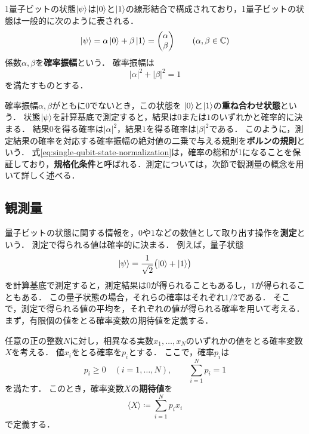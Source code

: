 1量子ビットの状態$\ket{\psi}$は$\ket{0}$と$\ket{1}$の線形結合で構成されており，1量子ビットの状態は一般的に次のように表される．
\begin{equation*}
  \ket{\psi}=\alpha\ket{0}+\beta\ket{1} = \begin{pmatrix}\alpha\\\beta\end{pmatrix}
  \qquad
  (\alpha,\beta\in\mathbb C)
\end{equation*}
係数$\alpha,\beta$を\textbf{確率振幅}という．
確率振幅は
\begin{equation}
  |\alpha|^2+|\beta|^2=1
  \label{eq:single-qubit-state-normalization}
\end{equation}
を満たすものとする．

確率振幅$\alpha,\beta$がともに$0$でないとき，この状態を
$\ket{0}$と$\ket{1}$の\textbf{重ね合わせ状態}という．
状態$\ket{\psi}$を計算基底で測定すると，結果は$0$または$1$のいずれかと確率的に決まる．
結果$0$を得る確率は$|\alpha|^2$，結果$1$を得る確率は$|\beta|^2$である．
このように，測定結果の確率を対応する確率振幅の絶対値の二乗で与える規則を\textbf{ボルンの規則}という．
式\eqref{eq:single-qubit-state-normalization}は，確率の総和が1になることを保証しており，\textbf{規格化条件}と呼ばれる．測定については，次節で観測量の概念を用いて詳しく述べる．

\subsection{観測量}
\label{subsec:observables}

量子ビットの状態に関する情報を，$0$や$1$などの数値として取り出す操作を\textbf{測定}という．
測定で得られる値は確率的に決まる．
例えば，量子状態
\begin{equation*}
  \ket{\psi}=\frac{1}{\sqrt{2}}\bigl(\ket{0}+\ket{1}\bigr)
\end{equation*}
を計算基底で測定すると，測定結果は$0$が得られることもあるし，$1$が得られることもある．
この量子状態の場合，それらの確率はそれぞれ$1/2$である．
そこで，測定で得られる値の平均を，それぞれの値が得られる確率を用いて考える．
まず，有限個の値をとる確率変数の期待値を定義する．

\begin{defi}[期待値]
  \label{def:expectation}
  任意の正の整数$N$に対し，相異なる実数$x_1,\ldots,x_N$のいずれかの値をとる確率変数$X$を考える．
  値$x_i$をとる確率を$p_i$とする．
  ここで，確率$p_i$は
  \begin{equation*}
    p_i\geq 0\quad(i=1,\ldots,N),
    \qquad
    \sum_{i=1}^{N}p_i=1
  \end{equation*}
  を満たす．
  このとき，確率変数$X$の\textbf{期待値}を
  \begin{equation}
    \langle X\rangle\coloneq\sum_{i=1}^{N}p_i x_i
    \label{eq:expectation-finite-distribution}
  \end{equation}
  で定義する．
\end{defi}

